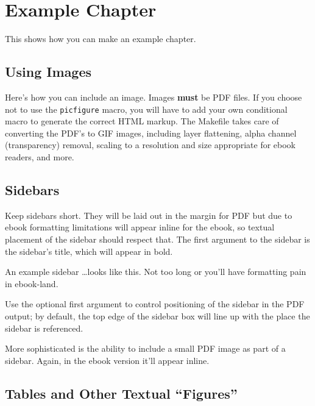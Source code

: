 \chapter[Example]{Example Chapter}

This shows how you can make an example chapter.

\section[Images]{Using Images}

Here's how you can include an image.  Images \textbf{must} be PDF
files.  If you choose not to use the \texttt{picfigure} macro, you will
have to add your own conditional macro to generate the correct HTML
markup.  The Makefile takes care of converting the PDF's to GIF images,
including layer flattening, alpha channel (transparency) removal,
scaling to a resolution and size appropriate for ebook readers, and
more.


\section{Sidebars}

Keep sidebars short.  They will be laid out in the margin for PDF but
due to ebook formatting limitations will appear inline for the ebook, so
textual placement of the sidebar should respect that.  The first
argument to the sidebar is the sidebar's title, which will appear in
bold.  
  \begin{sidebar}[-0.25in]{An example sidebar}
    \ldots{}looks like this.  Not too long or you'll have formatting
    pain in ebook-land.
  \end{sidebar}
Use the optional first argument to control positioning of the sidebar in
the PDF output; by default, the top edge of the sidebar box will line up
with the place the sidebar is referenced.  

More sophisticated is the ability to include a small PDF image as part
of a sidebar.  Again, in the ebook version it'll appear inline.

\section{Tables and Other Textual ``Figures''}

